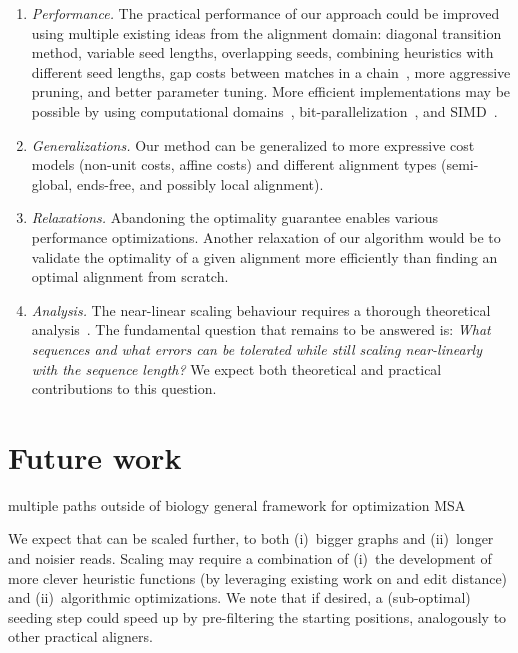 \begin{enumerate}
    \item \emph{Performance.} The practical performance of our \A approach could
        be improved using multiple existing ideas from the alignment domain:
        diagonal transition method, variable seed lengths, overlapping seeds,
        combining heuristics with different seed lengths, gap costs between
        matches in a chain~\citep{ukkonen1985algorithms,wilbur1984context}, more
        aggressive pruning, and better parameter tuning. More efficient
        implementations may be possible by using computational
        domains~\citep{spouge1989speeding}, bit-parallelization~\citep{myers1999fast},
        and SIMD~\citep{marco2021fast}.
    \item \emph{Generalizations.} Our method can be generalized to more
        expressive cost models (non-unit costs, affine costs) and different alignment
        types (semi-global, ends-free, and possibly local alignment).
    \item \emph{Relaxations.} Abandoning the optimality guarantee
        enables various performance optimizations. Another relaxation
        of our algorithm would be to validate the optimality of a given alignment more
        efficiently than finding an optimal alignment from scratch.
    \item \emph{Analysis.} The near-linear scaling behaviour requires a thorough
        theoretical analysis~\citep{medvedev2022limitations}. The fundamental
        question that remains to be answered is: \emph{What sequences and what
        errors can be tolerated while still scaling near-linearly with the
        sequence length?} We expect both theoretical and practical contributions
        to this question.
\end{enumerate}

\section{Future work}

multiple paths
outside of biology
general framework for optimization
MSA

We expect that \astarix can be scaled further, to both (i)~bigger graphs and
(ii)~longer and noisier reads. Scaling \astarix may require a combination of
(i)~the development of more clever heuristic functions (by leveraging existing
work on \A and edit distance) and (ii)~algorithmic optimizations. We note that
if desired, a (sub-optimal) seeding step could speed up \astarix by
pre-filtering the starting positions, analogously to other practical aligners.

